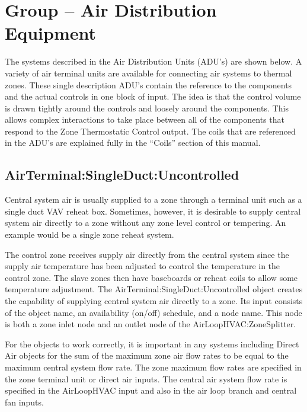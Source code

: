 \section{Group -- Air Distribution Equipment}\label{group-air-distribution-equipment}

The systems described in the Air Distribution Units (ADU's) are shown below. A variety of air terminal units are available for connecting air systems to thermal zones. These single description ADU's contain the reference to the components and the actual controls in one block of input. The idea is that the control volume is drawn tightly around the controls and loosely around the components. This allows complex interactions to take place between all of the components that respond to the Zone Thermostatic Control output. The coils that are referenced in the ADU's are explained fully in the ``Coils'' section of this manual.

\subsection{AirTerminal:SingleDuct:Uncontrolled}\label{airterminalsingleductuncontrolled}

Central system air is usually supplied to a zone through a terminal unit such as a single duct VAV reheat box. Sometimes, however, it is desirable to supply central system air directly to a zone without any zone level control or tempering. An example would be a single zone reheat system.

The control zone receives supply air directly from the central system since the supply air temperature has been adjusted to control the temperature in the control zone. The slave zones then have baseboards or reheat coils to allow some temperature adjustment. The AirTerminal:SingleDuct:Uncontrolled object creates the capability of supplying central system air directly to a zone. Its input consists of the object name, an availability (on/off) schedule, and a node name. This node is both a zone inlet node and an outlet node of the AirLoopHVAC:ZoneSplitter.

For the objects to work correctly, it is important in any systems including Direct Air objects for the sum of the maximum zone air flow rates to be equal to the maximum central system flow rate. The zone maximum flow rates are specified in the zone terminal unit or direct air inputs. The central air system flow rate is specified in the AirLoopHVAC input and also in the air loop branch and central fan inputs.

